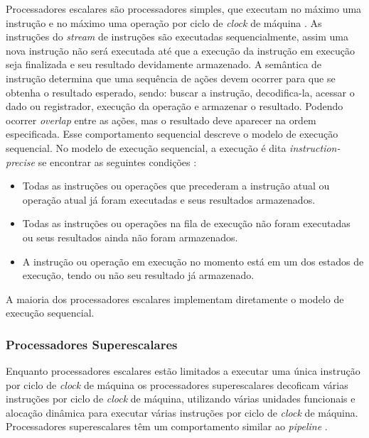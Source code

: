 Processadores escalares são processadores simples, que executam no 
máximo uma instrução e no máximo uma operação por ciclo de \textit{clock} de 
máquina \cite[3.5]{aapc}. 
As instruções do \textit{stream} de instruções são executadas 
sequencialmente, assim uma nova instrução não será executada até que a execução 
da instrução em execução seja finalizada e seu resultado devidamente
armazenado.
A semântica de instrução determina que uma sequência de ações devem ocorrer
para que se obtenha o resultado esperado, sendo: buscar a instrução,
decodifica-la, acessar o dado ou registrador, execução da operação e armazenar o
resultado. 
Podendo ocorrer \textit{overlap} entre as ações, mas o resultado deve
aparecer na ordem especificada.
Esse comportamento sequencial descreve o modelo de execução sequencial.
No modelo de execução sequencial, a execução é dita \textit{instruction-precise}
se encontrar as seguintes condições \cite{eopc}:

\begin{itemize}
        \item Todas as instruções ou operações que precederam a instrução atual
                ou operação atual já foram executadas e seus resultados
                armazenados.
        \item Todas as instruções ou operações na fila de execução não foram
                executadas ou seus resultados ainda não foram armazenados.
        \item A instrução ou operação em execução no momento está em um dos
                estados de execução, tendo ou não seu resultado já armazenado.
\end{itemize}

A maioria dos processadores escalares implementam diretamente o modelo de
execução sequencial.


\subsubsection{Processadores Superescalares}

Enquanto processadores escalares estão limitados a executar uma única instrução 
por ciclo de \textit{clock} de máquina os processadores superescalares decoficam
várias instruções por ciclo de \textit{clock} de máquina, utilizando várias
unidades funcionais e alocação dinâmica para executar várias instruções por
ciclo de \textit{clock} de máquina. 
Processadores superescalares têm um comportamento similar ao \textit{pipeline}
\cite{eopc}.

